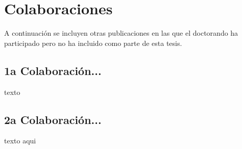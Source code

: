 \chapter{Colaboraciones} 
\label{Colab} 
 
\cleardoublepage
A continuación se incluyen otras publicaciones en las que el doctorando ha participado pero no ha incluido como parte de esta tesis. 

\section{1a Colaboración...}
texto

\section{2a Colaboración...}
texto aqui


\cleardoublepage